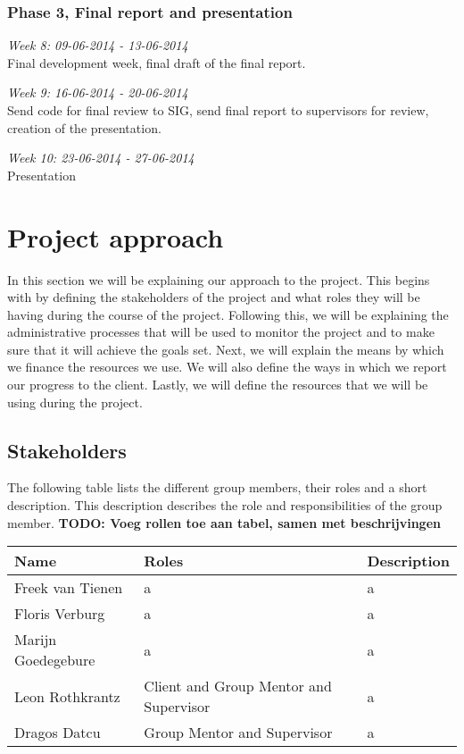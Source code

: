 \documentclass[]{article}
\newcommand{\TODO}[1]{{\color{red}\textbf{TODO: #1}}}
\begin{document}
\subsubsection{Phase 3, Final report and presentation}

\noindent\emph{Week 8: 09-06-2014 - 13-06-2014}\\
Final development week, final draft of the final report.

\noindent\emph{Week 9: 16-06-2014 - 20-06-2014}\\
Send code for final review to SIG, send final report to supervisors for review, creation of the presentation.

\noindent\emph{Week 10: 23-06-2014 - 27-06-2014}\\
Presentation
\section{Project approach}
In this section we will be explaining our approach to the project.
This begins with by defining the stakeholders of the project and what roles they will be having during the course of the project.
Following this, we will be explaining the administrative processes that will be used to monitor the project and to make sure that it will achieve the goals set.
Next, we will explain the means by which we finance the resources we use.
We will also define the ways in which we report our progress to the client.
Lastly, we will define the resources that we will be using during the project.

\subsection{Stakeholders}
The following table lists the different group members, their roles and a short description.
This description describes the role and responsibilities of the group member.
\TODO{Voeg rollen toe aan tabel, samen met beschrijvingen}
\begin{tabular}{|l|l|l|}
\hline
Name & Roles & Description\\
\hline
Freek van Tienen & a & a\\
\hline
Floris Verburg & a & a\\
\hline
Marijn Goedegebure & a & a\\
\hline
Leon Rothkrantz & Client and Group Mentor and Supervisor & a\\
\hline
Dragos Datcu &  Group Mentor and Supervisor & a\\
\hline
\end{tabular}
\end{document}
